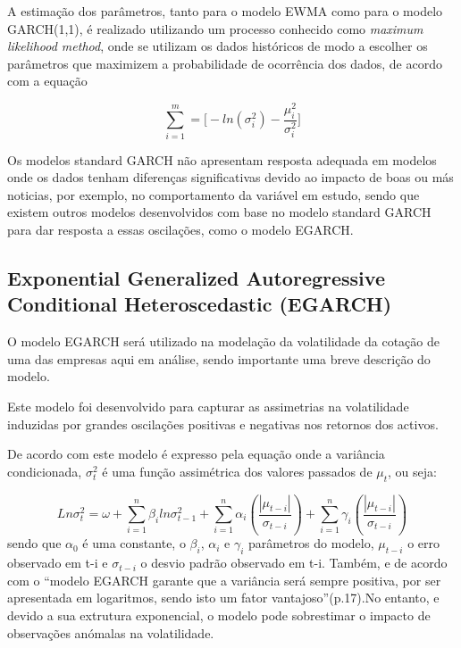 \documentclass[
  12pt,
  a4paper,
  openany]{book}
\begin{document}
A estimação dos parâmetros, tanto para o modelo EWMA como para o modelo GARCH(1,1), é realizado utilizando um processo conhecido como \emph{maximum likelihood method}, onde se utilizam os dados históricos de modo a escolher os parâmetros que maximizem a probabilidade de ocorrência dos dados, de acordo com a equação

\begin{equation} 
  \sum_{i=1}^{m}=\bigg[-ln(\sigma_{i}^{2})-\frac{\mu_{i}^{2}}{\sigma_{i}^{2}}\bigg]
  \label{eq:mgarch}
\end{equation}

Os modelos standard GARCH não apresentam resposta adequada em modelos onde os dados tenham diferenças significativas devido ao impacto de boas ou más noticias, por exemplo, no comportamento da variável em estudo, sendo que existem outros modelos desenvolvidos com base no modelo standard GARCH para dar resposta a essas oscilações, como o modelo EGARCH.

\hypertarget{exponential-generalized-autoregressive-conditional-heteroscedastic-egarch}{%
\subsection{Exponential Generalized Autoregressive Conditional Heteroscedastic (EGARCH)}\label{exponential-generalized-autoregressive-conditional-heteroscedastic-egarch}}

O modelo EGARCH será utilizado na modelação da volatilidade da cotação de uma das empresas aqui em análise, sendo importante uma breve descrição do modelo.

Este modelo foi desenvolvido para capturar as assimetrias na volatilidade induzidas por grandes oscilações positivas e negativas nos retornos dos activos.

De acordo com \citet{marta} este modelo é expresso pela equação onde a variância condicionada, \(\sigma_t^2\) é uma função assimétrica dos valores passados de \(\mu_t\), ou seja:

\begin{equation} 
  Ln \sigma_{t}^{2}= \omega+\sum_{i=1}^n\beta_iln\sigma_{t-1}^2+\sum_{i=1}^n\alpha_i(\frac{|\mu_{t-i}|}{\sigma_{t-i}})+\sum_{i=1}^n\gamma_i(\frac{|\mu_{t-i}|}{\sigma_{t-i}})
  \label{eq:egarch}
\end{equation}
sendo que \(\alpha_0\) é uma constante, o \(\beta_i\), \(\alpha_i\) e \(\gamma_i\) parâmetros do modelo, \(\mu_{t-i}\) o erro observado em t-i e \(\sigma_{t-i}\) o desvio padrão observado em t-i. Também, e de acordo com \citet{marta} o ``modelo EGARCH garante que a variância será sempre positiva, por ser apresentada em logaritmos, sendo isto um fator vantajoso''(p.17).No entanto, e devido a sua extrutura exponencial, o modelo pode sobrestimar o impacto de observações anómalas na volatilidade.
\end{document}
